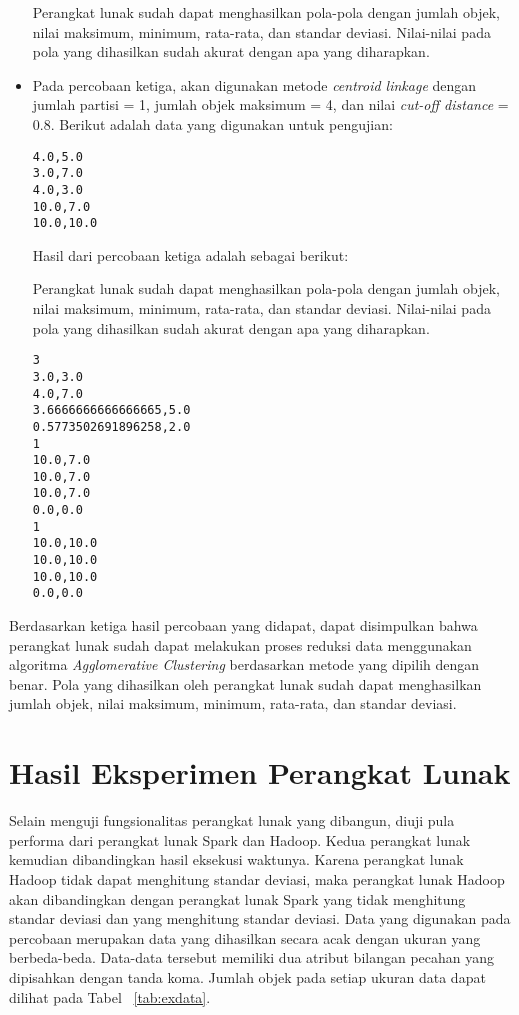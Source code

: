 \begin{itemize}
Perangkat lunak sudah dapat menghasilkan pola-pola dengan jumlah objek, nilai maksimum, minimum, rata-rata, dan standar deviasi. Nilai-nilai pada pola yang dihasilkan sudah akurat dengan apa yang diharapkan.

\item Pada percobaan ketiga, akan digunakan metode \textit{centroid linkage} dengan jumlah partisi = 1, jumlah objek maksimum = 4, dan nilai \textit{cut-off distance} = 0.8. Berikut adalah data yang digunakan untuk pengujian:

\begin{verbatim}
4.0,5.0
3.0,7.0
4.0,3.0
10.0,7.0
10.0,10.0
\end{verbatim}

Hasil dari percobaan ketiga adalah sebagai berikut:

Perangkat lunak sudah dapat menghasilkan pola-pola dengan jumlah objek, nilai maksimum, minimum, rata-rata, dan standar deviasi. Nilai-nilai pada pola yang dihasilkan sudah akurat dengan apa yang diharapkan.

\begin{verbatim}
3
3.0,3.0
4.0,7.0
3.6666666666666665,5.0
0.5773502691896258,2.0
1
10.0,7.0
10.0,7.0
10.0,7.0
0.0,0.0
1
10.0,10.0
10.0,10.0
10.0,10.0
0.0,0.0
\end{verbatim}

 
\end{itemize}
Berdasarkan ketiga hasil percobaan yang didapat, dapat disimpulkan bahwa perangkat lunak sudah dapat melakukan proses reduksi data menggunakan algoritma \textit{Agglomerative Clustering} berdasarkan metode yang dipilih dengan benar. Pola yang dihasilkan oleh perangkat lunak sudah dapat menghasilkan jumlah objek, nilai maksimum, minimum, rata-rata, dan standar deviasi.

\section{Hasil Eksperimen Perangkat Lunak}

Selain menguji fungsionalitas perangkat lunak yang dibangun, diuji pula performa dari perangkat lunak Spark dan Hadoop. Kedua perangkat lunak kemudian dibandingkan hasil eksekusi waktunya. Karena perangkat lunak Hadoop tidak dapat menghitung standar deviasi, maka perangkat lunak Hadoop akan dibandingkan dengan perangkat lunak Spark yang tidak menghitung standar deviasi dan yang menghitung standar deviasi. Data yang digunakan pada percobaan merupakan data yang dihasilkan secara acak dengan ukuran yang berbeda-beda. Data-data tersebut memiliki dua atribut bilangan pecahan yang dipisahkan dengan tanda koma. Jumlah objek pada setiap ukuran data dapat dilihat pada Tabel ~\ref{tab:exdata}.\\

